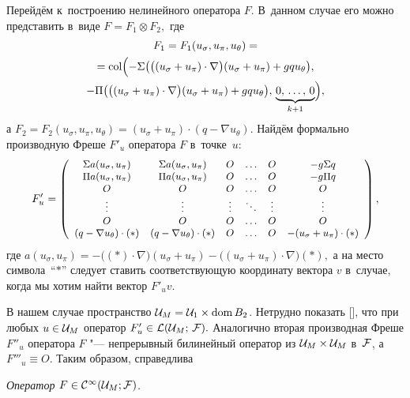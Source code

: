 Перейдём к~построению  нелинейного  оператора  $F.$ 
В~данном случае  его можно  представить  в~виде $F=F_1 \otimes F_2,$
где  
\begin{multline*}
F_1 =F_1 (u_{\sigma }, u_{\pi }, u_{\theta })= \\
= {\rm col} \Bigl(- \Sigma \bigl(\bigl(( u_{\sigma } + u_{\pi } ) \cdot \nabla \bigr)(u_{\sigma } + u_{\pi } ) + g q u_{\theta } \bigr), \\ - \Pi \bigl(\bigl( (u_{\sigma } + u_{\pi }) \cdot  \nabla \bigr)( u_{ \sigma } + u_{ \pi } ) + g q u_{ \theta } \bigr),  \, \underbrace{ 0,\, \ldots ,\, 0}_{k+1}\Bigr) ,
\end{multline*} 
  а $F_2 = F_2 (u_{\sigma }, u_{\pi }, u{_\theta }) = (u_{\sigma } + u_{\pi}) \cdot (q - \nabla u_{\theta } ).$
 Найдём формально производную  Фреше  $F'_u$ оператора $F$ в~точке~$u$:
\begin{displaymath}
{\small F'_u=
\left( \begin{array}{cccccc}
\Sigma a(u_{\sigma}, u_{\pi}) & \Sigma a(u_{\sigma}, u_{\pi}) & O& \ldots  &O& -g \Sigma q \\
\Pi a(u_{\sigma}, u_{\pi}) & \Pi a(u_{\sigma}, u_{\pi}) & O & \ldots &O & -g \Pi q \\
O & O & O & \ldots &O& O \\
\vdots &\vdots &\vdots &\ddots&\vdots &\vdots \\
O&O&O& \ldots &O&O \\
( q - \nabla u_{ \theta } ) \cdot  (*) & ( q - \nabla u_{ \theta } ) \cdot (*) &
O & \ldots &O & -(u_{ \sigma } + u_{ \pi } ) \cdot (*)
\end{array} \right), }
\end{displaymath}
где   $a(u_{\sigma}, u_{\pi})=-\bigl((*) \cdot \nabla \bigr)(u_{\sigma}+ u_{\pi}) - \bigl((u_{\sigma}+ u_{\pi}) \cdot \nabla \bigr)(*) ,$    а   на  место  символа~``$*$''
следует   ставить соответствующую координату  вектора  $v$  в~случае, когда мы хотим найти вектор $F'_u v .$

 В нашем  случае  пространство ${\cal U}_M={\cal U}_1 \times {\rm dom}\, B_2$.
Нетрудно показать \mbox{[]}, что при любых $u \in {\cal U}_M$ оператор $F'_u \in {\cal L}({\cal U}_M;\,{\cal F}) .$
Аналогично  вторая производная Фреше  $F''_u$ оператора $F$  "---  непрерывный  билинейный  оператор из ${\cal U}_M \times {\cal U}_M$ в~${\cal F}$, а~$F'''_u \equiv O.$
  Таким образом,
справедлива


\begin{theorem}[7]{\it Оператор $F \in {\cal C}^{\infty}({\cal U}_M; {\cal F})$.}
 \end{theorem}
 
